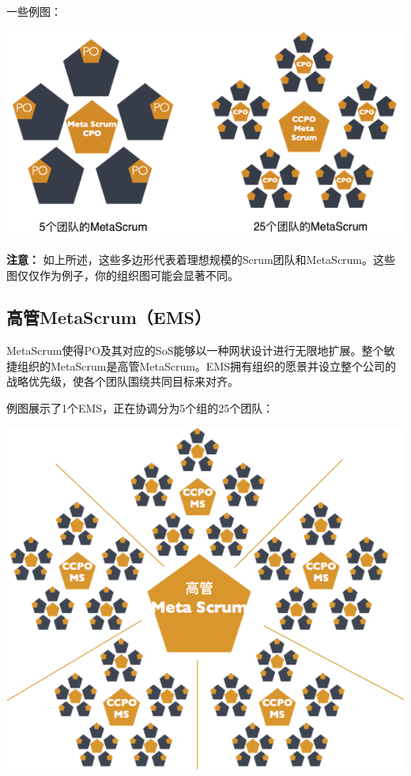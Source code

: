 \documentclass[12pt,a4paper,parskip=full]{scrartcl}
\begin{document}
\begin{CJK*}{UTF8}{gbsn}
一些例图：

\includegraphics[width=1.0\linewidth]{MetaScrum-R2.png}

\textbf{注意：} 如上所述，这些多边形代表着理想规模的Scrum团队和MetaScrum。这些图仅仅作为例子，你的组织图可能会显著不同。

\subsection{高管MetaScrum（EMS）}
MetaScrum使得PO及其对应的SoS能够以一种网状设计进行无限地扩展。整个敏捷组织的MetaScrum是高管MetaScrum。EMS拥有组织的愿景并设立整个公司的战略优先级，使各个团队围绕共同目标来对齐。

例图展示了1个EMS，正在协调分为5个组的25个团队：

\includegraphics[width=1.0\linewidth]{ExecMetaScrum.png}


\end{CJK*}
\end{document}
